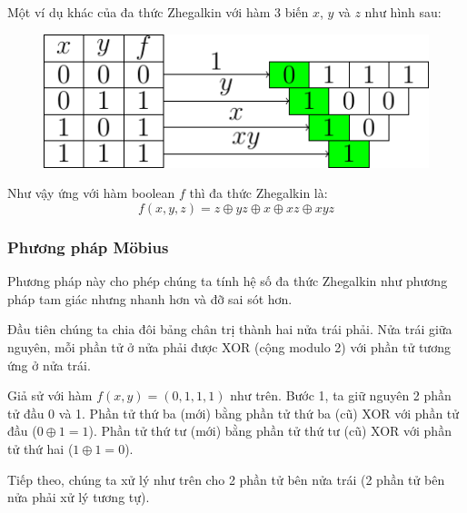 Một ví dụ khác của đa thức Zhegalkin với hàm 3 biến $x$, $y$ và $z$
như hình sau:

\begin{figure}[ht]
    \centering
    \includegraphics[page=2]{figures/boolean/zhegalkin.pdf}
\end{figure}

Như vậy ứng với hàm boolean $f$ thì đa thức Zhegalkin là:
\begin{equation*}
    f(x, y, z) = z \oplus yz \oplus x \oplus xz \oplus xyz
\end{equation*}

\subsubsection*{Phương pháp Möbius}

Phương pháp này cho phép chúng ta tính hệ số đa thức Zhegalkin
như phương pháp tam giác nhưng nhanh hơn và đỡ sai sót hơn.

Đầu tiên chúng ta chia đôi bảng chân trị thành hai nửa trái phải.
Nửa trái giữa nguyên, mỗi phần tử ở nửa phải được XOR (cộng modulo 2)
với phần tử tương ứng ở nửa trái.

Giả sử với hàm $f(x, y) = (0, 1, 1, 1)$ như trên. Bước 1, ta giữ
nguyên 2 phần tử đầu 0 và 1. Phần tử thứ ba (mới) bằng
phần tử thứ ba (cũ) XOR với phần tử đầu ($0 \oplus 1 = 1$).
Phần tử thứ tư (mới) bằng phần tử thứ tư (cũ) XOR với phần tử
thứ hai ($1 \oplus 1 = 0$).

Tiếp theo, chúng ta xử lý như trên cho 2 phần tử bên nửa trái 
(2 phần tử bên nửa phải xử lý tương tự).

